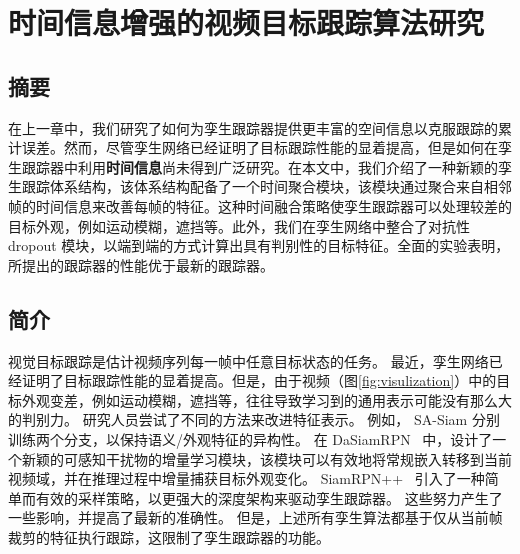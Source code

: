 \chapter{时间信息增强的视频目标跟踪算法研究}\label{chap:end}

\section{摘要}
在上一章中，我们研究了如何为孪生跟踪器提供更丰富的空间信息以克服跟踪的累计误差。然而，尽管孪生网络已经证明了目标跟踪性能的显着提高，但是如何在孪生跟踪器中利用\textbf{时间信息}尚未得到广泛研究。在本文中，我们介绍了一种新颖的孪生跟踪体系结构，该体系结构配备了一个时间聚合模块，该模块通过聚合来自相邻帧的时间信息来改善每帧的特征。这种时间融合策略使孪生跟踪器可以处理较差的目标外观，例如运动模糊，遮挡等。此外，我们在孪生网络中整合了对抗性 dropout 模块，以端到端的方式计算出具有判别性的目标特征。全面的实验表明，所提出的跟踪器的性能优于最新的跟踪器。

\section{简介}
\label{sec:intro}
视觉目标跟踪是估计视频序列每一帧中任意目标状态的任务。 
最近，孪生网络已经证明了目标跟踪性能的显着提高。但是，由于视频（图\ref{fig:visulization}）中的目标外观变差，例如运动模糊，遮挡等，往往导致学习到的通用表示可能没有那么大的判别力。
研究人员尝试了不同的方法来改进特征表示。
例如，
SA-Siam \cite{he2018twofold} 分别训练两个分支，以保持语义/外观特征的异构性。
在 DaSiamRPN~\cite{zhu2018distractor} 中，设计了一个新颖的可感知干扰物的增量学习模块，该模块可以有效地将常规嵌入转移到当前视频域，并在推理过程中增量捕获目标外观变化。
SiamRPN++~\cite{SiamRPN++} 引入了一种简单而有效的采样策略，以更强大的深度架构来驱动孪生跟踪器。
这些努力产生了一些影响，并提高了最新的准确性。
但是，上述所有孪生算法都基于仅从当前帧裁剪的特征执行跟踪，这限制了孪生跟踪器的功能。

